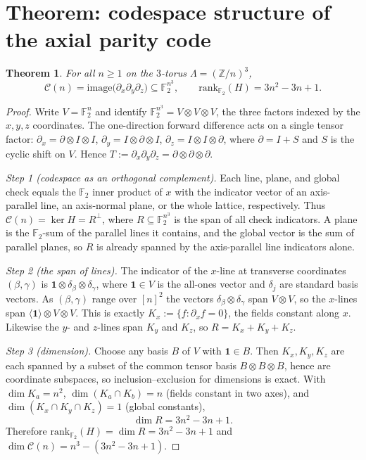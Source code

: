 \documentclass[11pt,a4paper]{article}
\newtheorem{theorem}{Theorem}
\begin{document}
\section{Theorem: codespace structure of the axial parity code}
\label{sec:theorem}

\begin{theorem}\label{thm:codespace}
For all $n \geq 1$ on the $3$-torus $\Lambda = (\mathbb{Z}/n)^3$,
\[
\mathcal{C}(n) = \mathrm{image}\bigl(\partial_x \partial_y \partial_z\bigr)
\subseteq \mathbb{F}_2^{n^3}, \qquad
\mathrm{rank}_{\mathbb{F}_2}(H) = 3n^2 - 3n + 1.
\]
\end{theorem}

\begin{proof}
Write $V = \mathbb{F}_2^n$ and identify
$\mathbb{F}_2^{n^3} = V \otimes V \otimes V$, the three factors indexed
by the $x,y,z$ coordinates. The one-direction forward difference acts on
a single tensor factor: $\partial_x = \partial \otimes I \otimes I$,
$\partial_y = I \otimes \partial \otimes I$, $\partial_z = I \otimes I
\otimes \partial$, where $\partial = I + S$ and $S$ is the cyclic shift
on $V$. Hence $T := \partial_x \partial_y \partial_z = \partial \otimes
\partial \otimes \partial$.

\smallskip
\noindent\emph{Step 1 (codespace as an orthogonal complement).} Each
line, plane, and global check equals the $\mathbb{F}_2$ inner product of
$x$ with the indicator vector of an axis-parallel line, an axis-normal
plane, or the whole lattice, respectively. Thus
$\mathcal{C}(n) = \ker H = R^\perp$, where $R \subseteq
\mathbb{F}_2^{n^3}$ is the span of all check indicators. A plane is the
$\mathbb{F}_2$-sum of the parallel lines it contains, and the global
vector is the sum of parallel planes, so $R$ is already spanned by the
axis-parallel line indicators alone.

\smallskip
\noindent\emph{Step 2 (the span of lines).} The indicator of the
$x$-line at transverse coordinates $(\beta,\gamma)$ is $\mathbf{1}
\otimes \delta_\beta \otimes \delta_\gamma$, where $\mathbf{1} \in V$ is
the all-ones vector and $\delta_j$ are standard basis vectors. As
$(\beta,\gamma)$ range over $[n]^2$ the vectors $\delta_\beta \otimes
\delta_\gamma$ span $V \otimes V$, so the $x$-lines span $\langle
\mathbf{1} \rangle \otimes V \otimes V$. This is exactly $K_x := \{f :
\partial_x f = 0\}$, the fields constant along $x$. Likewise the $y$-
and $z$-lines span $K_y$ and $K_z$, so $R = K_x + K_y + K_z$.

\smallskip
\noindent\emph{Step 3 (dimension).} Choose any basis $B$ of $V$ with
$\mathbf{1} \in B$. Then $K_x, K_y, K_z$ are each spanned by a subset of
the common tensor basis $B \otimes B \otimes B$, hence are coordinate
subspaces, so inclusion--exclusion for dimensions is exact. With
$\dim K_a = n^2$, $\dim(K_a \cap K_b) = n$ (fields constant in two axes),
and $\dim(K_x \cap K_y \cap K_z) = 1$ (global constants),
\[
\dim R = 3n^2 - 3n + 1.
\]
Therefore $\mathrm{rank}_{\mathbb{F}_2}(H) = \dim R = 3n^2 - 3n + 1$ and
$\dim \mathcal{C}(n) = n^3 - (3n^2 - 3n + 1)$.


\end{proof}
\end{document}
